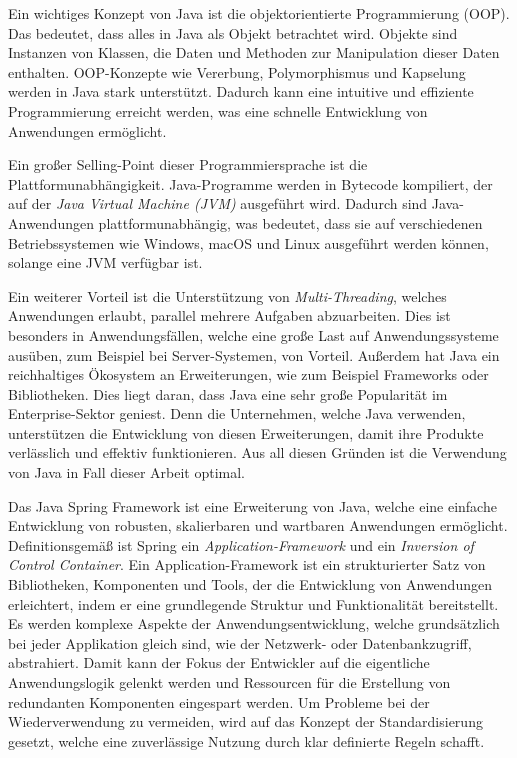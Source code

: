Ein wichtiges Konzept von Java ist die objektorientierte Programmierung (OOP). Das bedeutet, dass alles in Java als Objekt betrachtet wird. Objekte sind Instanzen von Klassen, die Daten und Methoden zur Manipulation dieser Daten enthalten. OOP-Konzepte wie Vererbung, Polymorphismus und Kapselung werden in Java stark unterstützt. Dadurch kann eine intuitive und effiziente Programmierung erreicht werden, was eine schnelle Entwicklung von Anwendungen ermöglicht. \cite{javaDocs}

Ein großer Selling-Point dieser Programmiersprache ist die Plattformunabhängigkeit. Java-Programme werden in Bytecode kompiliert, der auf der \emph{Java Virtual Machine (JVM)} ausgeführt wird. Dadurch sind Java-Anwendungen plattformunabhängig, was bedeutet, dass sie auf verschiedenen Betriebssystemen wie Windows, macOS und Linux ausgeführt werden können, solange eine JVM verfügbar ist. \cite{javaDocs}

Ein weiterer Vorteil ist die Unterstützung von \emph{Multi-Threading}, welches Anwendungen erlaubt, parallel mehrere Aufgaben abzuarbeiten. Dies ist besonders in Anwendungsfällen, welche eine große Last auf Anwendungssysteme ausüben, zum Beispiel bei Server-Systemen, von Vorteil. Außerdem hat Java ein reichhaltiges Ökosystem an Erweiterungen, wie zum Beispiel Frameworks oder Bibliotheken. Dies liegt daran, dass Java eine sehr große Popularität im Enterprise-Sektor geniest. Denn die Unternehmen, welche Java verwenden, unterstützen die Entwicklung von diesen Erweiterungen, damit ihre Produkte verlässlich und effektiv funktionieren. Aus all diesen Gründen ist die Verwendung von Java in Fall dieser Arbeit optimal. \cite{javaDocs,FireshipJava}

Das Java Spring Framework ist eine Erweiterung von Java, welche eine einfache Entwicklung von robusten, skalierbaren und wartbaren Anwendungen ermöglicht. Definitionsgemäß ist Spring ein \emph{Application-Framework} und ein \emph{Inversion of Control Container}. Ein Application-Framework ist ein strukturierter Satz von Bibliotheken, Komponenten und Tools, der die Entwicklung von Anwendungen erleichtert, indem er eine grundlegende Struktur und Funktionalität bereitstellt. Es werden komplexe Aspekte der Anwendungsentwicklung, welche grundsätzlich bei jeder Applikation gleich sind, wie der Netzwerk- oder Datenbankzugriff, abstrahiert. Damit kann der Fokus der Entwickler auf die eigentliche Anwendungslogik gelenkt werden und Ressourcen für die Erstellung von redundanten Komponenten eingespart werden. Um Probleme bei der Wiederverwendung zu vermeiden, wird auf das Konzept der Standardisierung gesetzt, welche eine zuverlässige Nutzung durch klar definierte Regeln schafft. \cite{springDocs}

